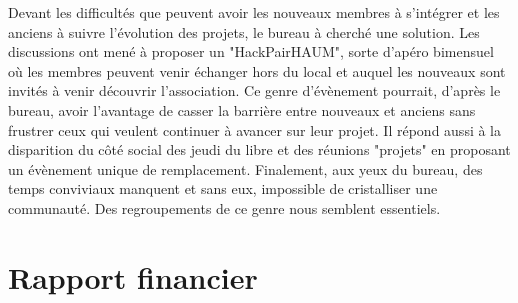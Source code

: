 \documentclass[11pt]{article}
\begin{document}
Devant les difficultés que peuvent avoir les nouveaux membres à s'intégrer et les anciens
à suivre l'évolution des projets, le bureau à cherché une solution. Les discussions ont
mené à proposer un "HackPairHAUM", sorte d'apéro bimensuel où les membres peuvent venir
échanger hors du local et auquel les nouveaux sont invités à venir découvrir
l'association. Ce genre d'évènement pourrait, d'après le bureau, avoir l'avantage de
casser la barrière entre nouveaux et anciens sans frustrer ceux qui veulent continuer à
avancer sur leur projet. Il répond aussi à la disparition du côté social des jeudi du
libre et des réunions "projets" en proposant un évènement unique de remplacement.
Finalement, aux yeux du bureau, des temps conviviaux manquent et sans eux, impossible de
cristalliser une communauté. Des regroupements de ce genre nous semblent essentiels.

\section{Rapport financier}
\end{document}
